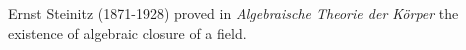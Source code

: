 \documentclass[12pt]{article}
\begin{document}
Ernst Steinitz (1871-1928) proved in {\em Algebraische Theorie der K\"orper} the existence of algebraic closure of a field.
\end{document}
